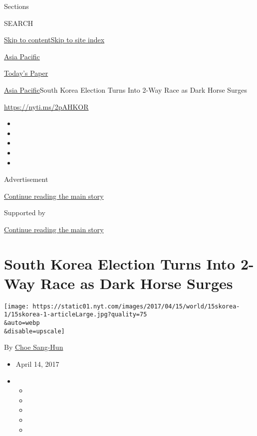 Sections

SEARCH

\protect\hyperlink{site-content}{Skip to
content}\protect\hyperlink{site-index}{Skip to site index}

\href{https://www.nytimes.com/section/world/asia}{Asia Pacific}

\href{https://myaccount.nytimes.com/auth/login?response_type=cookie\&client_id=vi}{}

\href{https://www.nytimes.com/section/todayspaper}{Today's Paper}

\href{/section/world/asia}{Asia Pacific}\textbar{}South Korea Election
Turns Into 2-Way Race as Dark Horse Surges

\url{https://nyti.ms/2pAHKOR}

\begin{itemize}
\item
\item
\item
\item
\item
\end{itemize}

Advertisement

\protect\hyperlink{after-top}{Continue reading the main story}

Supported by

\protect\hyperlink{after-sponsor}{Continue reading the main story}

\hypertarget{south-korea-election-turns-into-2-way-race-as-dark-horse-surges}{%
\section{South Korea Election Turns Into 2-Way Race as Dark Horse
Surges}\label{south-korea-election-turns-into-2-way-race-as-dark-horse-surges}}

\texttt{[image: https://static01.nyt.com/images/2017/04/15/world/15skorea-1/15skorea-1-articleLarge.jpg?quality=75\\\&auto=webp\\\&disable=upscale]}

By \href{https://www.nytimes.com/by/choe-sang-hun}{Choe Sang-Hun}

\begin{itemize}
\item
  April 14, 2017
\item
  \begin{itemize}
  \item
  \item
  \item
  \item
  \item
  \end{itemize}
\end{itemize}

